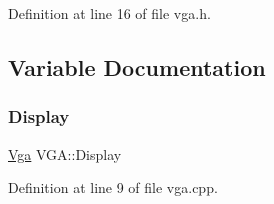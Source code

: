 Definition at line 16 of file vga.\+h.



\subsection{Variable Documentation}
\mbox{\label{namespace_v_g_a_a97690b6d72f447f3e5e1b744af8f47fe}} 
\subsubsection{\texorpdfstring{Display}{Display}}
{\footnotesize\ttfamily \hyperlink{class_v_g_a_1_1_vga}{Vga} V\+G\+A\+::\+Display}



Definition at line 9 of file vga.\+cpp.

